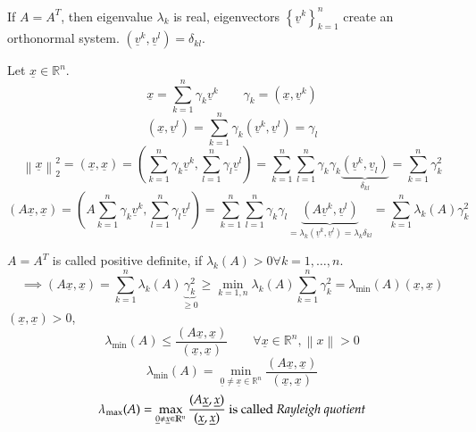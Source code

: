 \documentclass{article}
\newcommand{\set}[1]{\left\{#1\right\}}
\newcommand{\norm}[1]{\left\|#1\right\|}
\begin{document}
If $A = A^T$, then eigenvalue $\lambda_k$ is real, eigenvectors $\set{\underline{v}^k}_{k=1}^{n}$ create an orthonormal system.
$(\underline{v}^k, \underline{v}^l) = \delta_{kl}$.

Let $\underline{x} \in \mathbb R^n$.
\[ \underline{x} = \sum_{k=1}^n \gamma_k \underline{v}^k \qquad \gamma_k = (\underline{x}, \underline{v}^k) \]
\[ (\underline{x}, \underline{v}^l) = \sum_{k=1}^n \gamma_k (\underline{v}^k, \underline{v}^l) = \gamma_l \]
\[ \norm{\underline{x}}_2^2 = (\underline{x}, \underline{x}) = (\sum_{k=1}^n \gamma_k \underline{v}^k, \sum_{l=1}^n \gamma_l \underline{v}^l) = \sum_{k=1}^n \sum_{l=1}^n \gamma_k \gamma_k \underbrace{(\underline{v}^k, \underline{v}_l)}_{\delta_{kl}} = \sum_{k=1}^n \gamma^2_k \]
\[ (A\underline{x}, \underline{x}) = \left(A\sum_{k=1}^n \gamma_k \underline{v}^k, \sum_{l=1}^n \gamma_l \underline{v}^l\right) = \sum_{k=1}^n \sum_{l=1}^n \gamma_k \gamma_l \underbrace{(A\underline{v}^k, \underline{v}^l)}_{= \lambda_k (\underline{v}^k, \underline{v}^l) = \lambda_k \delta_{kl}} = \sum_{k=1}^n \lambda_k(A) \gamma_k^2 \]

$A = A^T$ is called positive definite, if $\lambda_k(A) > 0 \forall k = 1, \ldots, n$.
\[ \implies (A\underline{x}, \underline{x}) = \sum_{k=1}^n \lambda_k(A) \underbrace{\gamma_k^2}_{\geq 0} \geq \min_{k=1,n} \lambda_k(A) \sum_{k=1}^n \gamma_k^2 = \lambda_{\min}(A) (\underline{x}, \underline{x}) \]
$(\underline{x}, \underline{x}) > 0$,
\[ \lambda_{\min}(A) \leq \frac{(A\underline{x}, \underline{x})}{(\underline{x}, \underline{x})} \qquad \forall \underline{x} \in \mathbb R^n, \norm{x} > 0 \]
\[ \lambda_{\min}(A) = \min_{\underline{0} \neq \underline{x} \in \mathbb R^n} \frac{(A\underline{x}, \underline{x})}{(\underline{x}, \underline{x})} \]
\[ \lambda_{\max}(A) = \max_{\underline{0} \neq \underline{x} \in \mathbb R^n} \frac{(A\underline{x}, \underline{x})}{(\underline{x}, \underline{x})} \text{ is called \emph{Rayleigh quotient}} \]
\end{document}
